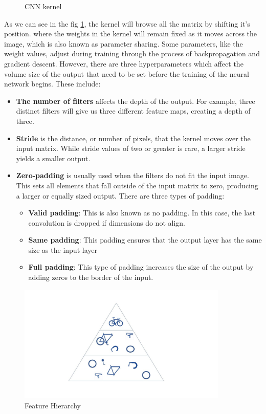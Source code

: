 \begin{enumerate}
\begin{figure}[H]
            \caption{CNN kernel}
            \label{fig:CNN-kernel}
        \end{figure}
        As we can see in the fig \ref{fig:CNN-kernel}, the kernel will browse all the matrix by shifting it's position. where the weights in the kernel will remain fixed as it moves across the image, which is also known as parameter sharing. Some parameters, like the weight values, adjust during training through the process of backpropagation and gradient descent. However, there are three hyperparameters which affect the volume size of the output that need to be set before the training of the neural network begins. These include:
        \begin{itemize}
            \item \textbf{The number of filters} affects the depth of the output. For example, three distinct filters will give us three different feature maps, creating a depth of three.
            \item \textbf{Stride} is the distance, or number of pixels, that the kernel moves over the input matrix. While stride values of two or greater is rare, a larger stride yields a smaller output.
            \item \textbf{Zero-padding }is usually used when the filters do not fit the input image. This sets all elements that fall outside of the input matrix to zero, producing a larger or equally sized output. There are three types of padding:
            \begin{itemize}
                \item \textbf{Valid padding}: This is also known as no padding. In this case, the last convolution is dropped if dimensions do not align.
                \item \textbf{Same padding}: This padding ensures that the output layer has the same size as the input layer
                \item \textbf{Full padding}: This type of padding increases the size of the output by adding zeros to the border of the input.
            \end{itemize}
        \end{itemize}
        
        \begin{figure}[H]
            \centering
            \includegraphics[width=10cm]{../images/CNN-Feature-Hierarchy.jpg}
            \caption{Feature Hierarchy}
            \label{fig:CNN-Feature-Hierarchy}
        \end{figure}
        

\end{enumerate}
